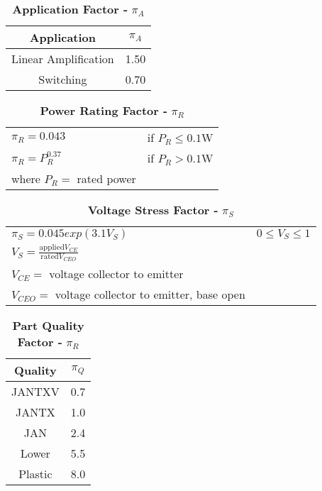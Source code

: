 \begin{table}[h]
\caption{\textbf{Application Factor -} $\pi_{A}$}
\label{table:applicationFactorTransSlow}
\begin{tabular}{|c|c|} \hline
\rowcolor{Gray}
\textbf{Application} & $\pi_{A}$ \\ \hline
Linear Amplification & 1.50 \\ \hline
Switching & 0.70 \\ \hline
\end{tabular}
\end{table}


\begin{table}[h]
\caption{\textbf{Power Rating Factor -} $\pi_{R}$}
\label{table:[powerRateStressFactorTransSlow}
\begin{tabular}{l l} 
$\pi_{R} = 0.043$ 						&	if $P_{R} \leq 0.1$W \\
$\pi_{R} = P^{0.37}_{R}$				&	if $P_{R} > 0.1$W \\
where $P_{R} = $ rated power
\end{tabular}
\end{table}


\begin{table}[h]
\caption{\textbf{Voltage Stress Factor -} $\pi_{S}$}
\label{table:voltStressFactorTransSlow}
\begin{tabular}{l l} 
$\pi_{S} = 0.045 exp(3.1V_{S})$ 						&	$0 \leq V_{S} \leq 1$  \\
$V_{S} = \frac{\text{applied} V_{CE}}{\text{rated} V_{CEO}}$	&				\\
$V_{CE} =$ voltage collector to emitter			&				\\
$V_{CEO} = $ voltage collector to emitter, base open &			\\
\end{tabular}
\end{table}

\begin{table}[h]
\caption{\textbf{Part Quality Factor -} $\pi_{R}$}
\label{table:partQualityFactorTransSlow}
\begin{tabular}{|c|c|} \hline
\rowcolor{Gray}
\textbf{Quality} & $\pi_{Q}$ \\ \hline
JANTXV & 0.7 \\ \hline
JANTX & 1.0 \\ \hline
JAN & 2.4 \\ \hline
Lower & 5.5 \\ \hline
Plastic & 8.0 \\ \hline
\end{tabular}
\end{table}


